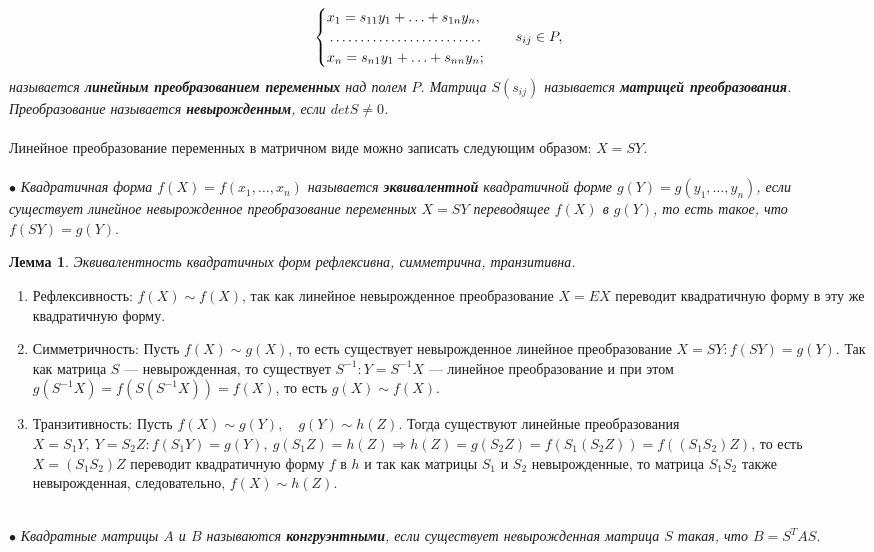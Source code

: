 $$\begin{cases} x_1 = s_{11} y_1 + \ldots + s_{1n} y_n, \\ \dotfill \\ x_n = s_{n1} y_1 + \ldots + s_{nn} y_n; \\ \end{cases}\quad s_{ij}\in P,$$ \textit{называется \textbf{линейным преобразованием переменных} над полем $P$. Матрица $S(s_{ij})$ называется \textbf{матрицей преобразования}. Преобразование называется \textbf{невырожденным}, если $detS\ne 0$.}\\\\
Линейное преобразование переменных в матричном виде можно записать следующим образом: $X = SY$.\\\\
$\bullet$ \textit{Квадратичная форма $f(X) = f(x_1, \dots, x_n)$ называется \textbf{эквивалентной} квадратичной форме $g(Y) = g(y_1, \dots, y_n)$, если существует линейное невырожденное преобразование переменных $X = SY$ переводящее $f(X)$ в $g(Y)$, то есть такое, что $f(SY) = g(Y)$}.
\newtheorem*{lem13_1}{Лемма}\begin{lem13_1}Эквивалентность квадратичных форм рефлексивна, симметрична, транзитивна.
\end{lem13_1}
\begin{Proof}
	\begin{enumerate}
		\item Рефлексивность: $f(X) \sim f(X)$, так как линейное невырожденное преобразование $X=EX$ переводит квадратичную форму в эту же квадратичную форму.
		\item Симметричность: Пусть $f(X) \sim g(X)$, то есть существует невырожденное линейное преобразование $X = SY : f(SY) = g(Y)$. Так как матрица $S$ --- невырожденная, то существует $S^{-1}: Y = S^{-1}X$ --- линейное преобразование и при этом $g(S^{-1}X) = f(S(S^{-1}X)) = f(X)$, то есть $g(X) \sim f(X)$.
		\item Транзитивность: Пусть $f(X) \sim g(Y), \quad g(Y) \sim h(Z)$. Тогда существуют линейные преобразования $X = S_1 Y,\ Y = S_2 Z : f(S_1Y) = g(Y),\ g(S_1Z) = h(Z)\Rightarrow h(Z) = g(S_2Z) = f(S_1(S_2Z)) = f((S_1S_2)Z)$, то есть $X=(S_1S_2)Z$ переводит квадратичную форму $f$ в $h$ и так как матрицы $S_1$ и $S_2$ невырожденные, то матрица $S_1S_2$ также невырожденная, следовательно, $f(X) \sim h(Z).$
	\end{enumerate}
\end{Proof}\\
$\bullet$ \textit{Квадратные матрицы $A$ и $B$ называются \textbf{конгруэнтными}, если существует невырожденная матрица $S$ такая, что $B = S^T A S$}.
